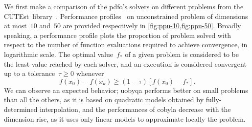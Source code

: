 \documentclass[11pt,draft]{article}
\numberwithin{equation}{section}
\def\obj{\ensuremath{f}}
\newcommand\iter[1][k]{x_{#1}}
\def\cutest{\mbox{CUTEst}}
\begin{document}
We first make a comparison of the \gls{pdfo}'s solvers on different problems from the \cutest\ library~\cite{Gould_Orban_Toint_2015}.
Performance profiles~\cite{Dolan_More_2002, More_Wild_2009} on unconstrained problem of dimensions at most~$10$ and~$50$ are provided respectively in \cref{fig:ppu-10,fig:ppu-50}.
Broadly speaking, a performance profile plots the proportion of problem solved with respect to the number of function evaluations required to achieve convergence, in logarithmic scale.
The optimal value~$\obj_{\ast}$ of a given problem is considered to be the least value reached by each solver, and an execution is considered convergent up to a tolerance~$\tau \ge 0$ whenever
\begin{equation}
    \label{eq:cvt}
    \obj(\iter[0]) - \obj(\iter) \ge (1 - \tau) [\obj(\iter[0]) - \obj_{\ast}].
\end{equation}
We can observe an expected behavior; \gls{uobyqa} performs better on small problems than all the others, as it is based on quadratic models obtained by fully-determined interpolation, and the performances of \gls{cobyla} decrease with the dimension rise, as it uses only linear models to approximate locally the problem.
\end{document}
